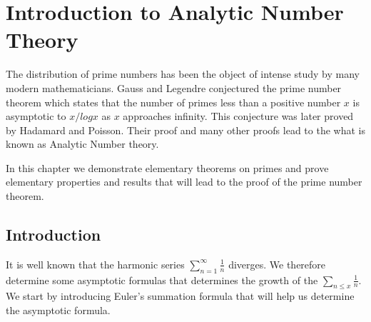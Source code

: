 \documentclass[12pt,letterpaper]{book}
\begin{document}
\chapter{Introduction to Analytic Number Theory}
 The distribution of prime numbers has
been the object of intense study by many modern mathematicians.
Gauss and Legendre conjectured the prime number theorem which states
that the number of primes less than a positive number $x$ is
asymptotic to $x/log x$ as $x$ approaches infinity.   This
conjecture was later proved by Hadamard and Poisson.  Their proof
and many other proofs lead to the what is known as Analytic Number
theory.
\par In this chapter we demonstrate elementary theorems on primes
and prove elementary properties and results that will lead to the
proof of the prime number theorem.
\section{Introduction}
It is well known that the harmonic series
$\sum_{n=1}^{\infty}\frac{1}{n}$ diverges.  We therefore determine
some asymptotic formulas that determines the growth of the
$\sum_{n\leq x}\frac{1}{n}$.  We start by introducing Euler's
summation formula that will help us determine the asymptotic
formula.
\end{document}
